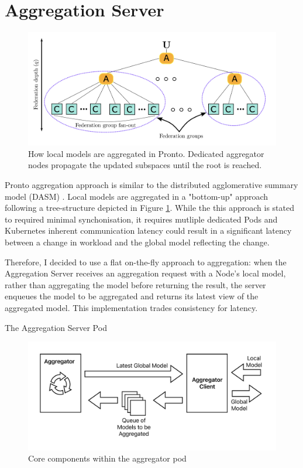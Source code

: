 \section{Aggregation Server}
\begin{figure}[H]
    \centering
    \includegraphics[width=\textwidth]{images/pronto-agg.png}
    \caption{How local models are aggregated in Pronto. Dedicated aggregator
    nodes propagate the updated subspaces until the root is reached.}
    \label{pronto-agg}
\end{figure}
Pronto aggregation approach is similar to the distributed agglomerative summary
model (DASM) \cite{}. Local models are aggregated in a "bottom-up" approach
following a tree-structure depicted in Figure \ref{pronto-agg}. While the
this approach is stated to required minimal synchonisation, it requires
mutliple dedicated Pods and Kubernetes inherent communication latency could
result in a significant latency between a change in workload and the global
model reflecting the change.

Therefore, I decided to use a flat on-the-fly approach to aggregation: when the
Aggregation Server receives an aggregation request with a Node's local model,
rather than aggregating the model before returning the result, the server
enqueues the model to be aggregated and returns its latest view of the
aggregated model. This implementation trades consistency for latency.


The Aggregation Server Pod
\begin{figure}[H]
    \centering
    \includegraphics[width=\textwidth]{images/spazio-agg.pdf}
    \caption{Core components within the aggregator pod}
    \label{spazio-agg-components}
\end{figure}

